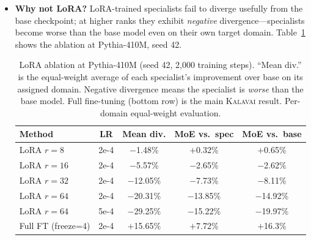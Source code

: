 \documentclass{article}
\newcommand{\kalavai}{\textsc{Kalavai}\xspace}
\begin{document}
\begin{itemize}[leftmargin=*, itemsep=4pt]
  \item \textbf{Why not LoRA?} LoRA-trained specialists fail to diverge usefully from the base checkpoint; at higher ranks they exhibit \emph{negative} divergence---specialists become worse than the base model even on their own target domain. Table~\ref{tab:lora} shows the ablation at Pythia-410M, seed 42.

\begin{table}[h]
\centering
\caption{LoRA ablation at Pythia-410M (seed 42, 2,000 training steps). ``Mean div.'' is the equal-weight average of each specialist's improvement over base on its assigned domain. Negative divergence means the specialist is \emph{worse} than the base model. Full fine-tuning (bottom row) is the main \kalavai result. Per-domain equal-weight evaluation.}
\label{tab:lora}
\small
\begin{tabular}{lcccc}
\toprule
\textbf{Method} & \textbf{LR} & \textbf{Mean div.} & \textbf{MoE vs.\ spec} & \textbf{MoE vs.\ base} \\
\midrule
LoRA $r=8$              & 2e-4 & $-$1.48\%  & $+$0.32\%  & $+$0.65\% \\
LoRA $r=16$             & 2e-4 & $-$5.57\%  & $-$2.65\%  & $-$2.62\% \\
LoRA $r=32$             & 2e-4 & $-$12.05\% & $-$7.73\%  & $-$8.11\% \\
LoRA $r=64$             & 2e-4 & $-$20.31\% & $-$13.85\% & $-$14.92\% \\
LoRA $r=64$             & 5e-4 & $-$29.25\% & $-$15.22\% & $-$19.97\% \\
\midrule
Full FT (freeze=4) & 2e-4 & $+$15.65\% & $+$7.72\%  & $+$16.3\% \\
\bottomrule
\end{tabular}
\end{table}


\end{itemize}
\end{document}
